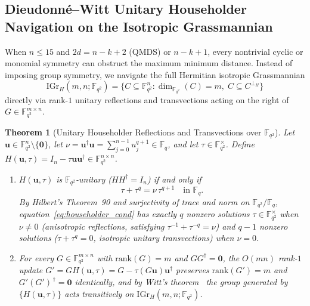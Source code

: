 \documentclass[11pt,a4paper]{article}
\newcommand{\vb}[1]{\symbf{#1}}
\newcommand{\vb}[1]{\mathbf{#1}}
\newtheorem{theorem}{Theorem}
\theoremstyle{remark}
\begin{document}
\subsection{Dieudonn\'e--Witt Unitary Householder Navigation on the Isotropic Grassmannian}

When $n \le 15$ and $2d = n - k + 2$ (QMDS) or $n - k + 1$, every nontrivial cyclic or monomial symmetry can obstruct the maximum minimum distance. Instead of imposing group symmetry, we navigate the full Hermitian isotropic Grassmannian
\[
  \mathrm{IGr}_H(m, n; \mathbb{F}_{q^2}) = \bigl\{ C \subseteq \mathbb{F}_{q^2}^n : \dim_{\mathbb{F}_{q^2}}(C) = m,\; C \subseteq C^{\perp_H} \bigr\}
\]
directly via rank-$1$ unitary reflections and transvections acting on the right of $G \in \mathbb{F}_{q^2}^{m \times n}$.

\begin{theorem}[Unitary Householder Reflections and Transvections over $\mathbb{F}_{q^2}$]\label{thm:householder}
Let $\vb{u} \in \mathbb{F}_{q^2}^n \setminus \{\vb{0}\}$, let $\nu = \vb{u}^\dagger \vb{u} = \sum_{j=0}^{n-1} u_j^{q+1} \in \mathbb{F}_q$, and let $\tau \in \mathbb{F}_{q^2}^\times$. Define $H(\vb{u}, \tau) = I_n - \tau \vb{u}\vb{u}^\dagger \in \mathbb{F}_{q^2}^{n \times n}$.
\begin{enumerate}
  \item $H(\vb{u}, \tau)$ is $\mathbb{F}_{q^2}$-unitary ($H H^\dagger = I_n$) if and only if
  \begin{equation}\label{eq:householder_cond}
    \tau + \tau^q = \nu\, \tau^{q+1} \quad \text{in } \mathbb{F}_q.
  \end{equation}
  By Hilbert's Theorem~90 and surjectivity of trace and norm on $\mathbb{F}_{q^2}/\mathbb{F}_q$, equation~\eqref{eq:householder_cond} has exactly $q$ nonzero solutions $\tau \in \mathbb{F}_{q^2}^\times$ when $\nu \ne 0$ (anisotropic reflections, satisfying $\tau^{-1} + \tau^{-q} = \nu$) and $q - 1$ nonzero solutions ($\tau + \tau^q = 0$, isotropic unitary transvections) when $\nu = 0$.
  \item For every $G \in \mathbb{F}_{q^2}^{m \times n}$ with $\mathrm{rank}(G) = m$ and $G G^\dagger = \vb{0}$, the $O(mn)$ rank-$1$ update $G' = G H(\vb{u}, \tau) = G - \tau (G\vb{u})\vb{u}^\dagger$ preserves $\mathrm{rank}(G') = m$ and $G'(G')^{\,\dagger} = \vb{0}$ identically, and by Witt's theorem~\cite{Dieudonne1963} the group generated by $\{H(\vb{u}, \tau)\}$ acts transitively on $\mathrm{IGr}_H(m, n; \mathbb{F}_{q^2})$.
\end{enumerate}
\end{theorem}
\end{document}
